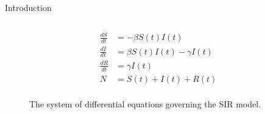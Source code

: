 \documentclass[final]{beamer}
\begin{document}
\begin{frame}
\begin{columns}
\begin{column}{.3\textwidth}
\begin{block}{Introduction}
\begin{block}{}
\begin{column}{.39\textwidth}
\begin{figure}[h]
\begin{align*}
                \frac{dS}{dt} &= -\beta S(t)I(t) \\
                \frac{dI}{dt} &= \beta S(t)I(t) - \gamma I(t) \\
                \frac{dR}{dt} &= \gamma I(t)\\
                N             &= S(t) + I(t) + R(t)\\
              \end{align*}
              \caption{The system of differential equations governing the SIR
                       model.}
              \label{eq:SIRdes}
            \end{figure}
          \end{column}
        \end{block}
      \end{block}
      

\end{column}
\end{columns}
\end{frame}
\end{document}
